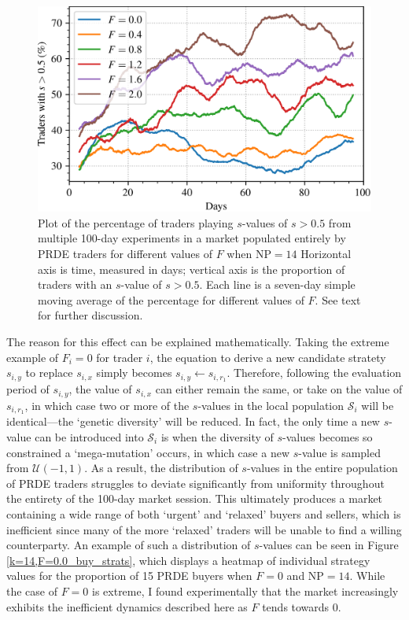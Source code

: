 \documentclass[conference]{IEEEtran}
\begin{document}
\begin{figure}[htbp]
    \centerline{\includegraphics[width=\columnwidth]{k=14_strats.png}}
    \caption{
        Plot of the percentage of traders playing $s$-values of $s>0.5$ from multiple 100-day experiments in a market populated entirely by PRDE traders for different values of $F$ when $\mathrm{NP}=14$ 
        Horizontal axis is time, measured in days; vertical axis is the proportion of traders with an $s$-value of $s>0.5$.
        Each line is a seven-day simple moving average of the percentage for different values of $F$.
        See text for further discussion.
    }
    \label{k=14_strats}
\end{figure}

The reason for this effect can be explained mathematically.
Taking the extreme example of $F_i=0$ for trader $i$, the equation to derive a new candidate stratety $s_{i,y}$ to replace $s_{i,x}$ simply becomes $s_{i,y}\leftarrow s_{i,r_1}$.
Therefore, following the evaluation period of $s_{i,y}$, the value of $s_{i,x}$ can either remain the same, or take on the value of $s_{i,r_1}$, in which case two or more of the $s$-values in the local population $\mathcal{S}_i$ will be identical---the `genetic diversity' will be reduced.
In fact, the only time a new $s$-value can be introduced into $\mathcal{S}_i$ is when the diversity of $s$-values becomes so constrained a `mega-mutation' occurs, in which case a new $s$-value is sampled from $\mathcal{U}(-1,1)$.
As a result, the distribution of $s$-values in the entire population of PRDE traders struggles to deviate significantly from uniformity throughout the entirety of the 100-day market session.
This ultimately produces a market containing a wide range of both `urgent' and `relaxed' buyers and sellers, which is inefficient since many of the more `relaxed' traders will be unable to find a willing counterparty.
An example of such a distribution of $s$-values can be seen in Figure \ref{k=14,F=0.0_buy_strats}, which displays a heatmap of individual strategy values for the proportion of 15 PRDE buyers when $F=0$ and $\mathrm{NP}=14$.
While the case of $F=0$ is extreme, I found experimentally that the market increasingly exhibits the inefficient dynamics described here as $F$ tends towards $0$.
\end{document}

